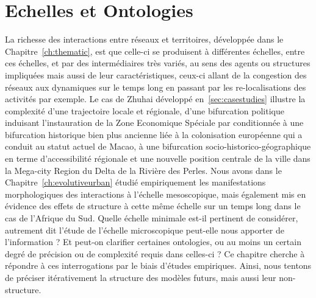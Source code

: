 





\chapter{Echelles et Ontologies}

\label{ch:micro} %





\bigskip



La richesse des interactions entre réseaux et territoires, développée dans le Chapitre~\ref{ch:thematic}, est que celle-ci se produisent à différentes échelles, entre ces échelles, et par des intermédiaires très variés, au sens des agents ou structures impliquées mais aussi de leur caractéristiques, ceux-ci allant de la congestion des réseaux aux dynamiques sur le temps long en passant par les re-localisations des activités par exemple. Le cas de Zhuhai développé en~\ref{sec:casestudies} illustre la complexité d'une trajectoire locale et régionale, d'une bifurcation politique induisant l'instauration de la Zone Economique Spéciale par  conditionnée à une bifurcation historique bien plus ancienne liée à la colonisation européenne qui a conduit au statut actuel de Macao, à une bifurcation socio-historico-géographique en terme d'accessibilité régionale et une nouvelle position centrale de la ville dans la Mega-city Region du Delta de la Rivière des Perles. Nous avons dans le Chapitre~\ref{ch:evolutiveurban} étudié empiriquement les manifestations morphologiques des interactions à l'échelle mesoscopique, mais également mis en évidence des effets de structure à cette même échelle sur un temps long dans le cas de l'Afrique du Sud. Quelle échelle minimale est-il pertinent de considérer, autrement dit l'étude de l'échelle microscopique peut-elle nous apporter de l'information ? Et peut-on clarifier certaines ontologies, ou au moins un certain degré de précision ou de complexité requis dans celles-ci ? Ce chapitre cherche à répondre à ces interrogations par le biais d'études empiriques. Ainsi, nous tentons de préciser itérativement la structure des modèles futurs, mais aussi leur non-structure.

